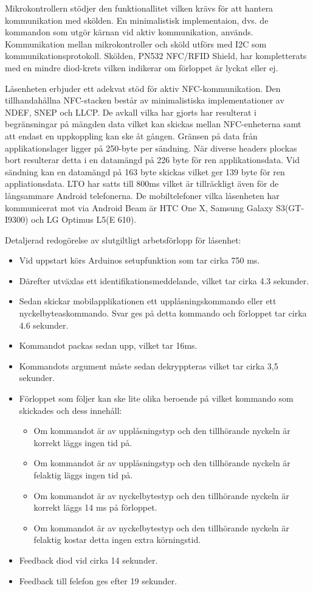 \documentclass[11pt]{article}
\begin{document}
Mikrokontrollern stödjer den funktionallitet vilken krävs för att hantera kommunikation med skölden. En minimalistisk implementaion, dvs. de kommandon som utgör kärnan vid aktiv kommunikation, används. Kommunikation mellan mikrokontroller och sköld utförs med I2C som kommunikationsprotokoll. Skölden, PN532 NFC/RFID Shield, har kompletterats med en mindre diod-krets vilken indikerar om förloppet är lyckat eller ej.

Låsenheten  erbjuder ett adekvat stöd för aktiv NFC-kommunikation. Den tillhandahållna NFC-stacken består av 
minimalistiska implementationer av NDEF, SNEP och LLCP. De avkall vilka har gjorts har resulterat i begränsningar på mängden data vilket kan skickas mellan NFC-enheterna samt att endast en uppkoppling kan ske åt gången. Gränsen på data från applikationslager ligger på 250-byte per sändning. När diverse headers plockas bort resulterar detta i en datamängd på 226 byte för ren applikationsdata. Vid sändning kan en datamängd på 163 byte skickas vilket ger 139 byte för ren appliationsdata.  LTO har satts till 800ms vilket är tillräckligt även för de långsammare Android telefonerna. De mobiltelefoner vilka låsenheten har kommunicerat mot via Android Beam är HTC One X, Samsung Galaxy S3(GT-I9300) och LG Optimus L5(E 610). 

Detaljerad redogörelse av slutgiltligt arbetsförlopp för låsenhet:

\begin{itemize}
\item Vid uppstart körs Arduinos setupfunktion som tar cirka 750 ms.
\item Därefter utväxlas ett identifikationsmeddelande, vilket tar cirka 4.3 sekunder.
\item Sedan skickar mobilapplikationen ett upplåsningskommando eller ett nyckelbyteaskommando. Svar ges på detta kommando och förloppet tar cirka 4.6 sekunder.
\item Kommandot packas sedan upp, vilket tar  16ms.
\item Kommandots argument måste sedan dekryppteras vilket tar cirka 3,5 sekunder.
\item Förloppet som följer kan ske lite olika beroende på vilket kommando som skickades och dess innehåll:

\begin{itemize}
\item Om kommandot är av upplåsningstyp och den tillhörande nyckeln är korrekt läggs ingen tid på.
\item Om kommandot är av upplåsningstyp och den tillhörande nyckeln är felaktig läggs ingen tid på.
\item Om kommandot är av nyckelbytestyp och den tillhörande nyckeln är korrekt läggs 14 ms på förloppet.
\item Om kommandot är av nyckelbytestyp och den tillhörande nyckeln är felaktig kostar detta ingen extra körningstid.
\end{itemize}

\item Feedback diod vid cirka 14 sekunder.
\item Feedback till felefon ges efter 19 sekunder.
\end{itemize}
\end{document}
